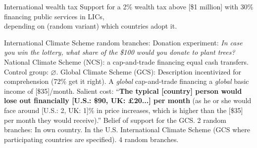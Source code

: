 \documentclass[aspectratio=169,xcolor=dvipsnames, 11pt,mathserif]{beamer}
\begin{document}
\begin{frame}{International wealth tax}
\centering Support for a 2\% wealth tax above [\$1 million] with 30\% financing public services in LICs,\\depending on (random variant) which countries adopt it.
\end{frame}

\begin{frame}{International Climate Scheme}
    \bbvsp {} random branches:
      \bbvsp \ip Donation experiment: \textit{In case you win the lottery, what share of the \$100 would you donate to plant trees?}
      \ip National Climate Scheme (NCS): a cap-and-trade financing equal cash transfers.
      \ip Control group: $\varnothing$. \ee
    \ip Global Climate Scheme (GCS): %
      \bbvsp \ip Description incentivized for comprehension (72\% get it right).
      \ip A \textit{global} cap-and-trade financing a \textit{global} basic income of [\$35]/month.
      \ip Salient cost: ``\textbf{The typical [country] person would lose out financially [U.S.: \$90, UK: £20...] per month} (as he or she would face around [U.S.: 2, UK: 1]\% in price increases, which is higher than the [\$35] per month they would receive).'' \ee
    \ip Belief of support for the GCS. 2 random branches:
      \bbvs \ip In own country.
      \ip In the U.S. \ee
    \ip International Climate Scheme (GCS where participating countries are specified). 4 random branches. 
    \ee
\end{frame}
\end{document}
